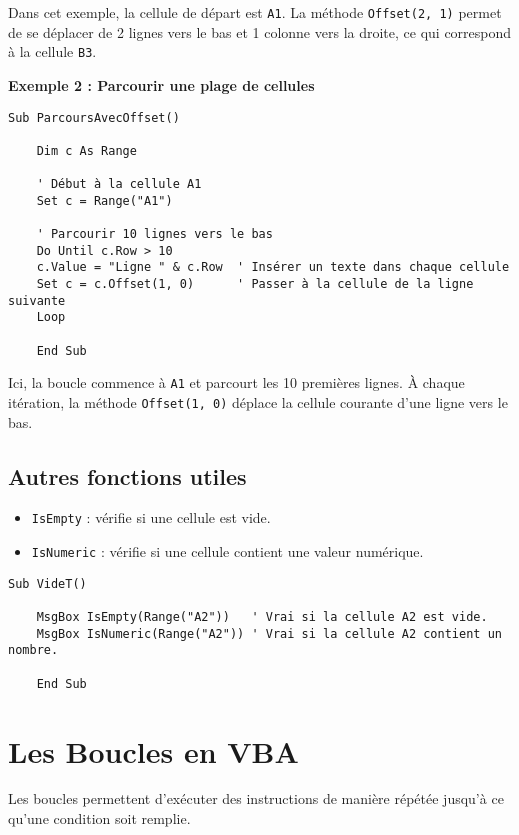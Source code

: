 \documentclass[a4paper,12pt]{report}
\begin{document}
Dans cet exemple, la cellule de départ est \texttt{A1}. La méthode \texttt{Offset(2, 1)} permet de se déplacer de 2 lignes vers le bas et 1 colonne vers la droite, ce qui correspond à la cellule \texttt{B3}.

\textbf{Exemple 2 : Parcourir une plage de cellules}
\begin{lstlisting}[language=vbscript, caption={Parcourir une plage avec \texttt{Offset}}]
	Sub ParcoursAvecOffset()
	
	Dim c As Range
	
	' Début à la cellule A1
	Set c = Range("A1")
	
	' Parcourir 10 lignes vers le bas
	Do Until c.Row > 10
	c.Value = "Ligne " & c.Row  ' Insérer un texte dans chaque cellule
	Set c = c.Offset(1, 0)      ' Passer à la cellule de la ligne suivante
	Loop
	
	End Sub
\end{lstlisting}

Ici, la boucle commence à \texttt{A1} et parcourt les 10 premières lignes. À chaque itération, la méthode \texttt{Offset(1, 0)} déplace la cellule courante d'une ligne vers le bas.

\subsection{Autres fonctions utiles}
\begin{itemize}
	\item \texttt{IsEmpty} : vérifie si une cellule est vide.
	\item \texttt{IsNumeric} : vérifie si une cellule contient une valeur numérique.
\end{itemize}

\begin{lstlisting}[caption=Exemple de fonctions IsEmpty et IsNumeric]
	Sub VideT()
	
	MsgBox IsEmpty(Range("A2"))   ' Vrai si la cellule A2 est vide.
	MsgBox IsNumeric(Range("A2")) ' Vrai si la cellule A2 contient un nombre.
	
	End Sub
\end{lstlisting}

\section{Les Boucles en VBA}

Les boucles permettent d'exécuter des instructions de manière répétée jusqu'à ce qu'une condition soit remplie.
\end{document}
